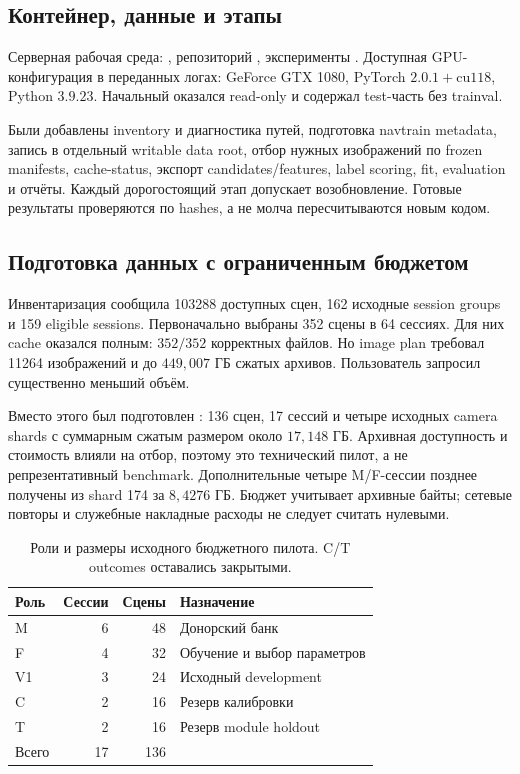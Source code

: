 \documentclass[11pt,a4paper]{article}
\newcommand{\code}[1]{\texttt{\detokenize{#1}}}
\begin{document}
\subsection{Контейнер, данные и этапы}
Серверная рабочая среда: \code{egorov_drivesuprim}, репозиторий , эксперименты . Доступная GPU-конфигурация в переданных логах: GeForce GTX 1080, PyTorch $2.0.1+\mathrm{cu118}$, Python $3.9.23$. Начальный  оказался read-only и содержал test-часть без trainval.

Были добавлены inventory и диагностика путей, подготовка navtrain metadata, запись в отдельный writable data root, отбор нужных изображений по frozen manifests, cache-status, экспорт candidates/features, label scoring, fit, evaluation и отчёты. Каждый дорогостоящий этап допускает возобновление. Готовые результаты проверяются по hashes, а не молча пересчитываются новым кодом.

\subsection{Подготовка данных с ограниченным бюджетом}
Инвентаризация сообщила 103288 доступных сцен, 162 исходные session groups и 159 eligible sessions. Первоначально выбраны 352 сцены в 64 сессиях. Для них cache оказался полным: $352/352$ корректных файлов. Но image plan требовал 11264 изображений и до $449{,}007$ ГБ сжатых архивов. Пользователь запросил существенно меньший объём.

Вместо этого был подготовлен \code{budget20gb_v1}: 136 сцен, 17 сессий и четыре исходных camera shards с суммарным сжатым размером около $17{,}148$ ГБ. Архивная доступность и стоимость влияли на отбор, поэтому это технический пилот, а не репрезентативный benchmark. Дополнительные четыре M/F-сессии позднее получены из shard 174 за $8{,}4276$ ГБ. Бюджет учитывает архивные байты; сетевые повторы и служебные накладные расходы не следует считать нулевыми.

\par
\begin{table}[htbp]\centering\small
\caption{Роли и размеры исходного бюджетного пилота. C/T outcomes оставались закрытыми.}
\begin{tabular}{@{}lrrl@{}}\toprule
Роль & Сессии & Сцены & Назначение\\\midrule
M & 6 & 48 & Донорский банк\\
F & 4 & 32 & Обучение и выбор параметров\\
V1 & 3 & 24 & Исходный development\\
C & 2 & 16 & Резерв калибровки\\
T & 2 & 16 & Резерв module holdout\\\midrule
Всего & 17 & 136 & \\\bottomrule
\end{tabular}
\end{table}
\par
\end{document}
